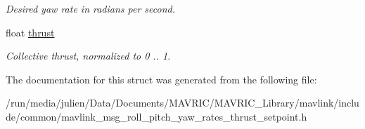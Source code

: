 \begin{DoxyCompactItemize}
\begin{DoxyCompactList}\small\item\em Desired yaw rate in radians per second. \end{DoxyCompactList}\item 
\hypertarget{struct____mavlink__roll__pitch__yaw__rates__thrust__setpoint__t_a787dc065ed3049391a32033cf00066b2}{float \hyperlink{struct____mavlink__roll__pitch__yaw__rates__thrust__setpoint__t_a787dc065ed3049391a32033cf00066b2}{thrust}}\label{struct____mavlink__roll__pitch__yaw__rates__thrust__setpoint__t_a787dc065ed3049391a32033cf00066b2}

\begin{DoxyCompactList}\small\item\em Collective thrust, normalized to 0 .. 1. \end{DoxyCompactList}\end{DoxyCompactItemize}


The documentation for this struct was generated from the following file\+:\begin{DoxyCompactItemize}
\item 
/run/media/julien/\+Data/\+Documents/\+M\+A\+V\+R\+I\+C/\+M\+A\+V\+R\+I\+C\+\_\+\+Library/mavlink/include/common/mavlink\+\_\+msg\+\_\+roll\+\_\+pitch\+\_\+yaw\+\_\+rates\+\_\+thrust\+\_\+setpoint.\+h\end{DoxyCompactItemize}
